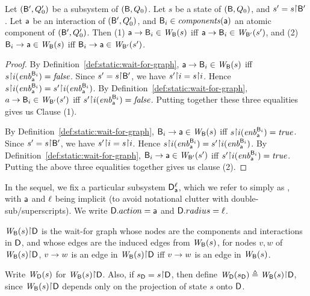 \begin{proposition} \label{prop:edge-projection}
Let $(\B', Q'_0)$ be a subsystem of
$(\B, Q_0)$. Let $s$ be a state of $(\B, Q_0)$, and $s' = s \pj \B'$.
Let $\act$ be an interaction of $(\B', Q'_0)$, and $\B_i \in \cmps{\act}$ an atomic component of $(\B', Q'_0)$.
Then 
(1) $\act \ar \B_i \in \wfg{\B}{s}$ iff $\act \ar \B_i \in \wfg{\B'}{s'}$, and
(2) $\B_i \ar \act \in \wfg{\B}{s}$ iff $\B_i \ar \act \in \wfg{\B'}{s'}$.
\end{proposition}
%
\begin{proof}
By Definition~\ref{def:static:wait-for-graph}, $\act \ar \B_i \in \wfg{\B}{s}$ iff $s \pj i (\gd{\act}{\B_i}) = \false$.
Since $s' = s \pj \B'$, we have $s' \pj i = s \pj i$. Hence
$s \pj i (\gd{\act}{\B_i}) = s' \pj i (\gd{\act}{\B_i})$.
By Definition~\ref{def:static:wait-for-graph}, 
$a \ar \B_i \in \wfg{\B'}{s'}$ iff $s' \pj i (\gd{\act}{\B_i}) = \false$.
Putting together these three equalities gives us Clause (1).

By Definition~\ref{def:static:wait-for-graph},
$\B_i \ar \act \in \wfg{\B}{s}$ iff 
$s \pj i (\gd{\act}{\B_i}) = \true$.
Since $s' = s \pj \B'$, we have $s' \pj i = s \pj i$. Hence
$s \pj i (\gd{\act}{\B_i}) = s' \pj i (\gd{\act}{\B_i})$.
By Definition~\ref{def:static:wait-for-graph},
$\B_i \ar \act \in \wfg{\B'}{s'}$ iff $s' \pj i (\gd{\act}{\B_i}) = \true$.
Putting the above three equalities together gives us clause (2).
\end{proof}

In the sequel, we fix a particular subsystem $\dsk{\act}{\l}$, which
we refer to simply as \DS, with $\act$ and $\l$ being implicit (to
avoid notational clutter with double-sub/superscripts). 
We write $\DS.action = \act$ and $\DS.radius = \l$. 


\begin{definition} \label{defn:projWgraph}
$\wfg{\B}{s} \pj \DS$ is the wait-for graph whose nodes are the
components and interactions in $\DS$, and whose edges are the induced
edges from $\wfg{\B}{s}$, \ie for nodes $v, w$ of $\wfg{\B}{s} \pj \DS$,
$v \ar w$ is an edge in $\wfg{\B}{s} \pj \DS$ iff $v \ar w$ is an edge in $\wfg{\B}{s}$.

Write $\lwfg{B}{s}{\DS}$ for $\wfg{\B}{s} \pj \DS$.
Also, if $\sD = s \pj \DS$, then define $\lwfg{B}{\sD}{\DS} \df \wfg{\B}{s} \pj \DS$, since $\wfg{\B}{s} \pj \DS$ depends only
on the projection of state $s$ onto $\DS$.
\end{definition}


